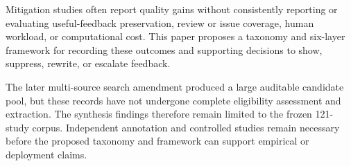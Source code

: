 \documentclass[10pt]{article}
\begin{document}
Mitigation studies often report quality gains without consistently reporting or evaluating useful-feedback preservation, review or issue coverage, human workload, or computational cost. This paper proposes a taxonomy and six-layer framework for recording these outcomes and supporting decisions to show, suppress, rewrite, or escalate feedback.

The later multi-source search amendment produced a large auditable candidate pool, but these records have not undergone complete eligibility assessment and extraction. The synthesis findings therefore remain limited to the frozen 121-study corpus. Independent annotation and controlled studies remain necessary before the proposed taxonomy and framework can support empirical or deployment claims.
\end{document}
